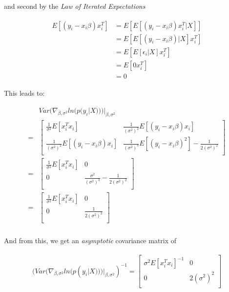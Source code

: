 \documentclass{article}
\begin{document}
and second by the \textit{Law of Iterated Expectations}

\begin{align}
\begin{aligned}
E\left[(y_i - x_i\beta)x_i^T\right] &= E\left[E\left[(y_i - x_i\beta)x_i^T|X \right] \right]\\
						&= E\left[E\left[(y_i - x_i\beta)|X \right] x_i^T \right]\\
						&= E\left[E\left[\epsilon_i|X \right] x_i^T \right]\\
						&= E\left[0 x_i^T \right]\\
						&= 0
\end{aligned}
\end{align}


This leads to:

\begin{align}
\begin{aligned}
&Var(\nabla_{\beta,\sigma^2}ln(p(y_i|X)))|_{\beta, \sigma^2}\\
=&
\begin{bmatrix}
\frac{1}{\sigma^2}E\left[x^T_ix_i\right]			&  \frac{1}{(\sigma^2)^2}E\left[(y_i - x_i \beta)x_i\right]				\\
 \frac{1}{(\sigma^2)^2}E\left[(y_i - x_i \beta)x_i\right]	& \frac{1}{(\sigma^2)^3}E\left[(y_i - x_i \beta)^2\right] -  \frac{1}{2(\sigma^2)^2}	\\
\end{bmatrix}\\
=&
\begin{bmatrix}
\frac{1}{\sigma^2}E\left[x^T_ix_i\right]	&  0				\\
0								& \frac{\sigma^2}{(\sigma^2)^3} -  \frac{1}{2(\sigma^2)^2}	\\
\end{bmatrix}\\
=&
\begin{bmatrix}
\frac{1}{\sigma^2}E\left[x^T_ix_i\right]	&  0				\\
0								& \frac{1}{2(\sigma^2)^2}	\\
\end{bmatrix}\\
\end{aligned}
\end{align}

And from this, we get an \textit{asymptotic} covariance matrix of

\begin{align}
\begin{aligned}
(Var(\nabla_{\beta,\sigma^2}ln(p(y_i|X)))|_{\beta, \sigma^2})^{-1} =
\begin{bmatrix}
\sigma^2E\left[x^T_ix_i\right]^{-1}	&  0				\\
0							& 2(\sigma^2)^2	\\
\end{bmatrix}
\end{aligned}
\end{align}
\end{document}
